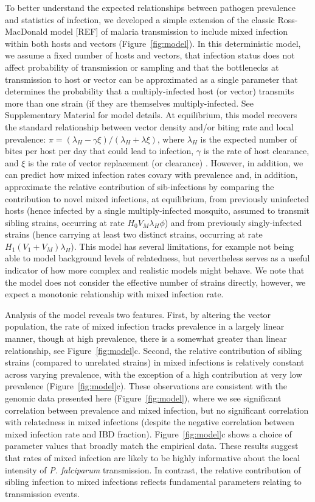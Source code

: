 \documentclass[9pt,lineno]{elife}
\begin{document}
To better understand the expected relationships between pathogen prevalence and statistics of infection, we developed a simple extension of the classic Ross-MacDonald model [REF] of malaria transmission to include mixed infection within both hosts and vectors (Figure~\ref{fig:model}). In this deterministic model, we assume a fixed number of hosts and vectors, that infection status does not affect probability of transmission or sampling and that the bottlenecks at transmission to host or vector can be approximated as a single parameter that determines the probability that a multiply-infected host (or vector) transmits more than one strain (if they are themselves multiply-infected.  See Supplementary Material for model details.  At equilibrium, this model recovers the standard relationship between vector density and/or biting rate and local prevalence: $\pi = (\lambda_H - \gamma \xi)/(\lambda_H + \lambda \xi)$, where $\lambda_H$ is the expected number of bites per host per day that could lead to infection, $\gamma$ is the rate of host clearance, and $\xi$ is the rate of vector replacement (or clearance) .  However, in addition, we  can predict how mixed infection rates covary with prevalence and, in addition, approximate the relative contribution of sib-infections by comparing the contribution to novel mixed infections, at equilibrium, from previously uninfected hosts (hence infected by a single multiply-infected mosquito, assumed to transmit sibling strains, occurring at rate $H_0 V_M \lambda_H \phi$) and from previously singly-infected strains (hence carrying at least two distinct strains, occurring at rate $H_1 (V_1 + V_M) \lambda_H$).  This model has several limitations, for example not being able to model background levels of relatedness, but nevertheless serves as a useful indicator of how more complex and realistic models might behave.  We note that the model does not consider the effective number of strains directly, however, we expect a monotonic relationship with mixed infection rate.

Analysis of the model reveals two features.  First, by altering the vector population, the rate of mixed infection tracks prevalence in a largely linear manner, though at high prevalence, there is a somewhat greater than linear relationship, see Figure~\ref{fig:model}c.  Second, the relative contribution of sibling strains (compared to unrelated strains) in mixed infections is relatively constant across varying prevalence, with the exception of a  high contribution at very low prevalence (Figure~\ref{fig:model}c).  These observations are consistent with the genomic data presented here (Figure~\ref{fig:model}), where we see significant correlation between prevalence and mixed infection, but no significant correlation with relatedness in mixed infections (despite the negative correlation between mixed infection rate and IBD fraction).  Figure~\ref{fig:model}c shows a choice of parameter values that broadly match the empirical data.  These results suggest that rates of mixed infection are likely to be highly informative about the local intensity of {\it P. falciparum} transmission.  In contrast, the relative contribution of sibling infection to mixed infections reflects fundamental parameters relating to transmission events.
\end{document}
